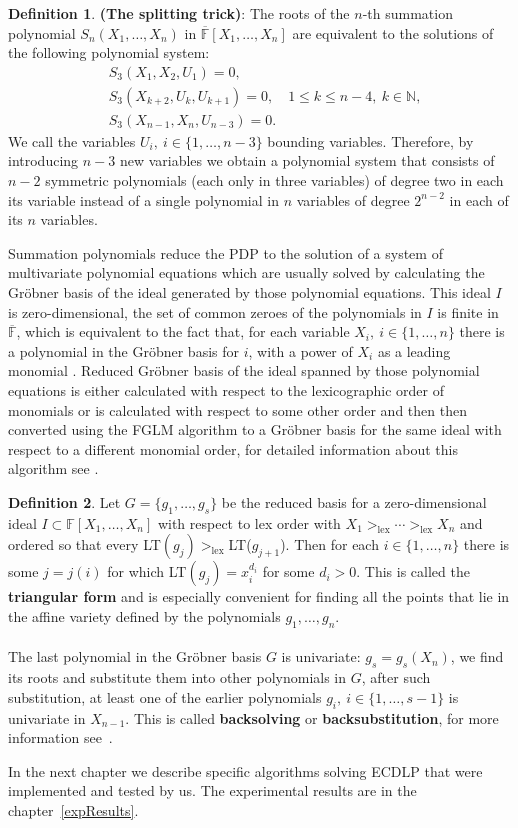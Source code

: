 \documentclass[thesis=M,english]{FITthesis}[2012/10/20]
\theoremstyle{remark}
\theoremstyle{definition}
\newtheorem{DF}{Definition}[section]
\begin{document}
\begin{DF}\textbf{(The splitting trick)}: The roots of the $n$-th summation polynomial $S_n(X_1,\ldots,X_n)$ in $\overline{\mathbb{F}}[X_1,\ldots,X_n]$ are equivalent to the solutions of the following polynomial system:
\begin{align*}
&S_3(X_1,X_2,U_1) = 0, \\
&S_3(X_{k+2}, U_{k}, U_{k+1}) = 0, \quad 1 \leq k \leq n-4,\ k \in \mathbb{N}, \\
&S_3(X_{n-1}, X_n, U_{n-3}) = 0.
\end{align*} 
We call the variables $U_i,\ i \in \{1, \ldots, n - 3\}$ bounding variables. Therefore, by introducing $n-3$ new variables we obtain a polynomial system that consists of $n-2$ symmetric polynomials (each only in three variables) of degree two in each its variable instead of a single polynomial in $n$ variables of degree $2^{n-2}$ in each of its $n$ variables.
\end{DF}
\noindent Summation polynomials reduce the PDP to the solution of a system of multivariate polynomial equations which are usually solved by calculating the Gröbner basis of the ideal generated by those polynomial equations. This ideal $I$ is zero-dimensional, the set of common zeroes of the polynomials in $I$ is finite in $\overline{\mathbb{F}}$, which is equivalent to the fact that, for each variable $X_i,\ i \in \{1,\ldots,n\}$ there is a polynomial in the Gröbner basis for $i$, with a power of $X_i$ as a leading monomial \cite{FGLM}. Reduced Gröbner basis of the ideal spanned by those polynomial equations is either calculated with respect to the lexicographic order of monomials or is calculated with respect to some other order and then then converted using the FGLM algorithm to a Gröbner basis for the same ideal with respect to a different monomial order, for detailed information about this algorithm see \cite{FGLM}.
\begin{DF}
\label{triagForm}
Let $G = \{g_1,\ldots,g_s\}$ be the reduced basis for a zero-dimensional ideal $I \subset \mathbb{F}[X_1,\ldots,X_n]$ with respect to lex order with $X_1 >_{\text{lex}} \cdots >_{\text{lex}} X_n$ and ordered so that every LT$(g_j) >_{\text{lex}} $LT($g_{j+1}$). Then for each $i \in \{1,\ldots,n\}$ there is some $j=j(i)$ for which LT$(g_j)=x_i^{d_i}$ for some $d_i > 0.$ This is called the \textbf{triangular form} and is especially convenient for finding all the points that lie in the affine variety defined by the polynomials $g_1,\ldots,g_n$. \\ \\
\noindent The last polynomial in the Gröbner basis $G$ is univariate: $g_s = g_s(X_n)$, we find its roots and substitute them into other polynomials in $G$, after such substitution, at least one of the earlier polynomials $g_i,\ i \in \{1,\ldots,s-1\}$ is univariate in $X_{n-1}$. This is called \textbf{backsolving} or \textbf{backsubstitution}, for more information see~\cite{week11}.
\end{DF}
\noindent In the next chapter we describe specific algorithms solving ECDLP that were implemented and tested by us. The experimental results are in the chapter~\ref{expResults}.
\end{document}
